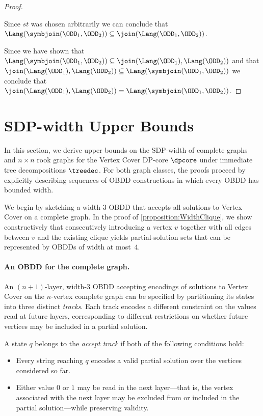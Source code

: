 \begin{proof}
\begin{itemize}
    \end{itemize}

    Since $st$ was chosen arbitrarily we can conclude that $\Lang(\symbjoin(\ODD_1,\ODD_2)) \subseteq \join(\Lang(\ODD_1,\ODD_2))$.

    Since we have shown that $\Lang(\symbjoin(\ODD_1,\ODD_2)) \subseteq \join(\Lang(\ODD_1),\Lang(\ODD_2))$ and that $\join(\Lang(\ODD_1),\Lang(\ODD_2)) \subseteq \Lang(\symbjoin(\ODD_1,\ODD_2))$ we conclude that $\join(\Lang(\ODD_1),\Lang(\ODD_2)) = \Lang(\symbjoin(\ODD_1,\ODD_2))$.
     
\end{proof}


\section{SDP-width Upper Bounds}

In this section, we derive upper bounds on the SDP-width of complete graphs and
$n \times n$ rook graphs for the {\sc Vertex Cover} DP-core $\dpcore$ under
immediate tree decompositions $\treedec$. For both graph classes, the proofs
proceed by explicitly describing sequences of OBDD constructions in which every
OBDD has bounded width.

We begin by sketching a width-$3$ OBDD that accepts all solutions to
{\sc Vertex Cover} on a complete graph. In the proof of
\cref{proposition:WidthClique}, we show constructively that consecutively
introducing a vertex $v$ together with all edges between $v$ and the existing
clique yields partial-solution sets that can be represented by OBDDs of width at
most~$4$.

\paragraph{An OBDD for the complete graph.}

An $(n+1)$-layer, width-$3$ OBDD accepting encodings of solutions to
{\sc Vertex Cover} on the $n$-vertex complete graph can be specified by
partitioning its states into three distinct \emph{tracks}. Each track encodes a
different constraint on the values read at future layers, corresponding to
different restrictions on whether future vertices may be included in a partial
solution.

A state $q$ belongs to the \emph{accept track} if both of the following
conditions hold:
\begin{itemize}
    \item Every string reaching $q$ encodes a valid partial solution over the
    vertices considered so far.
    \item Either value $0$ or $1$ may be read in the next layer—that is, the
    vertex associated with the next layer may be excluded from or included in
    the partial solution—while preserving validity.
\end{itemize}

